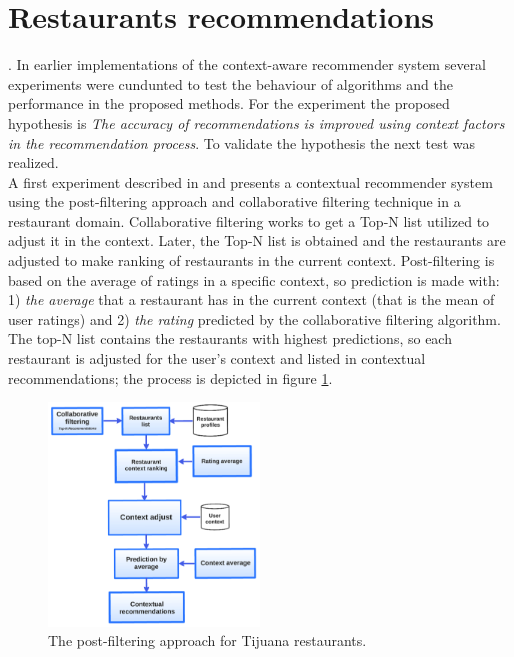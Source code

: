 \section{Restaurants recommendations} \label{restaurants}.
In earlier implementations of the context-aware recommender system  
several experiments were cundunted to test the behaviour of algorithms 
and the performance in the proposed methods. 
For the experiment the proposed hypothesis is \textit{The accuracy of 
recommendations is improved using context factors in the 
recommendation process}. To validate the hypothesis the next test  
was realized. \\
A first experiment described in \cite{ramirez2013restaurant} and presents a  
contextual recommender system using the post-filtering approach and 
collaborative filtering technique in a restaurant domain. 
Collaborative filtering works to get a Top-N list utilized to adjust it in 
the context. 
Later, the Top-N list is obtained and the restaurants are adjusted to 
make ranking of restaurants  in the current context. Post-filtering is
based on the average  of ratings in a specific context, so prediction
is made with: 1) \textit{the average} that a restaurant has in the
current context (that is the  mean of user ratings) and 2) 
\textit{the rating} predicted by the collaborative filtering algorithm. 
The top-N list contains the restaurants with highest predictions, 
so each restaurant is adjusted for the user's context and listed in 
contextual recommendations; the process is depicted in figure
\ref{fig:postfiltering}.
\begin{figure}
\centering
\captionsetup{font=footnotesize}
\setlength\fboxsep{0pt}
\includegraphics[width=0.50\textwidth]{img/posfil.png}
\caption{The post-filtering approach for Tijuana restaurants.}
\label{fig:postfiltering}     
\end{figure}

